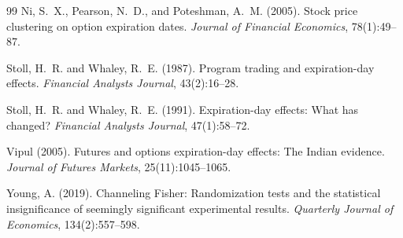 \begin{thebibliography}{99}
Ni, S.~X., Pearson, N.~D., and Poteshman, A.~M. (2005).
\newblock Stock price clustering on option expiration dates.
\newblock \emph{Journal of Financial Economics}, 78(1):49--87.

Stoll, H.~R. and Whaley, R.~E. (1987).
\newblock Program trading and expiration-day effects.
\newblock \emph{Financial Analysts Journal}, 43(2):16--28.

Stoll, H.~R. and Whaley, R.~E. (1991).
\newblock Expiration-day effects: What has changed?
\newblock \emph{Financial Analysts Journal}, 47(1):58--72.

Vipul (2005).
\newblock Futures and options expiration-day effects: The Indian evidence.
\newblock \emph{Journal of Futures Markets}, 25(11):1045--1065.

Young, A. (2019).
\newblock Channeling Fisher: Randomization tests and the statistical insignificance of
  seemingly significant experimental results.
\newblock \emph{Quarterly Journal of Economics}, 134(2):557--598.

\end{thebibliography}
